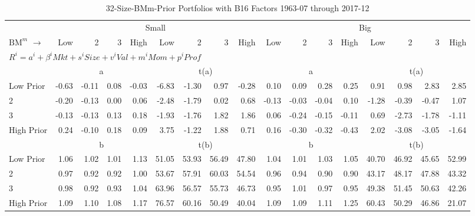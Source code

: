 
\begin{table}[!ht]
\footnotesize
\centering
\caption{32-Size-BMm-Prior Portfolios with B16 Factors 1963-07 through 2017-12}
\begin{tabular}{lrrrrrrrrrrrrrrrr}
  \toprule
     & \multicolumn{8}{c}{Small} & \multicolumn{8}{c}{Big}  \\
     \cmidrule(r){2-9} \cmidrule(r){10-17}
    $\text{BM}^{m}$ $\rightarrow$ & Low & 2 & 3 & High & Low & 2 & 3 & High & Low & 2 & 3 & High & Low & 2 & 3 & High  \\ 
  \midrule
  \multicolumn{17}{l}{$R^i=a^i+\beta^iMkt+s^iSize+v^iVal+m^iMom+p^iProf$}  \\
  
     & \multicolumn{4}{c}{a} & \multicolumn{4}{c}{t(a)}  & \multicolumn{4}{c}{a} & \multicolumn{4}{c}{t(a)}   \\
     \cmidrule(r){2-5} \cmidrule(r){6-9}  \cmidrule(r){10-13} \cmidrule(r){14-17} 
    Low Prior  & -0.63  & -0.11  & 0.08  & -0.03  & -6.83  & -1.30  & 0.97  & -0.28  & 0.10  & 0.09  & 0.28  & 0.25  & 0.91  & 0.98  & 2.83  & 2.85   \\
    2  & -0.20  & -0.13  & 0.00  & 0.06  & -2.48  & -1.79  & 0.02  & 0.68  & -0.13  & -0.03  & -0.04  & 0.10  & -1.28  & -0.39  & -0.47  & 1.07   \\
    3  & -0.13  & -0.13  & 0.13  & 0.18  & -1.93  & -1.76  & 1.82  & 1.86  & 0.06  & -0.24  & -0.15  & -0.11  & 0.69  & -2.73  & -1.78  & -1.11   \\
    High Prior  & 0.24  & -0.10  & 0.18  & 0.09  & 3.75  & -1.22  & 1.88  & 0.71  & 0.16  & -0.30  & -0.32  & -0.43  & 2.02  & -3.08  & -3.05  & -1.64   \\
    
  
     & \multicolumn{4}{c}{b} & \multicolumn{4}{c}{t(b)}  & \multicolumn{4}{c}{b} & \multicolumn{4}{c}{t(b)}   \\
     \cmidrule(r){2-5} \cmidrule(r){6-9}  \cmidrule(r){10-13} \cmidrule(r){14-17} 
    Low Prior  & 1.06  & 1.02  & 1.01  & 1.13  & 51.05  & 53.93  & 56.49  & 47.80  & 1.04  & 1.01  & 1.03  & 1.05  & 40.70  & 46.92  & 45.65  & 52.99   \\
    2  & 0.97  & 0.92  & 0.92  & 1.00  & 53.67  & 57.91  & 60.03  & 54.54  & 0.96  & 0.94  & 0.90  & 0.90  & 43.17  & 48.17  & 47.88  & 43.32   \\
    3  & 0.98  & 0.92  & 0.93  & 1.04  & 63.96  & 56.57  & 55.73  & 46.73  & 0.95  & 1.01  & 0.97  & 0.95  & 49.38  & 51.45  & 50.63  & 42.26   \\
    High Prior  & 1.09  & 1.10  & 1.08  & 1.17  & 76.57  & 60.16  & 50.49  & 40.04  & 1.09  & 1.09  & 1.11  & 1.25  & 60.43  & 50.29  & 46.86  & 21.07   \\
    

\end{tabular}
\end{table}
